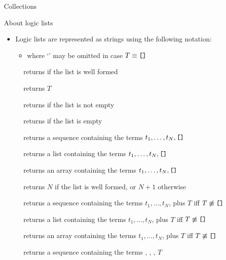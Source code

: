 \documentclass[handout]{beamer}
\begin{document}
\begin{frame}[allowframebreaks]{Collections}
\begin{alertblock}{About logic lists}
\begin{itemize}
            \item Logic lists are represented as strings using the following notation:
            \begin{center}
                \pl{[$t_1$, $t_2$, \ldots $t_n$ | $T$]}
            \end{center}
            \begin{itemize}
                \item where `' may be omitted in case $T \equiv \texttt{[]}$
            \end{itemize}
        \end{itemize}
    \end{alertblock}
    \begin{description}
        \item[] returns  if the list is well formed
        \item[] returns $T$
        \item[] returns  if the list is not empty
        \item[] returns  if the list is empty
        \item[] returns a sequence containing the terms $t_1, \ldots, t_N, \texttt{[]}$
        \item[] returns a list containing the terms $t_1, \ldots, t_N, \texttt{[]}$
        \item[] returns an array containing the terms $t_1, \ldots, t_N, \texttt{[]}$
        \item[] returns $N$ if the list is well formed, or $N+1$ otherwise
        \item[] returns a sequence containing the terms $t_1, \ldots, t_N$, plus $T$ iff $T \not\equiv \texttt{[]}$
        \item[] returns a list containing the terms $t_1, \ldots, t_N$, plus $T$ iff $T \not\equiv \texttt{[]}$
        \item[] returns an array containing the terms $t_1, \ldots, t_N$, plus $T$ iff $T \not\equiv \texttt{[]}$
        \item[] returns a sequence containing the terms , , \pl{\ldots}, $T$
    \end{description}


\end{frame}
\end{document}
